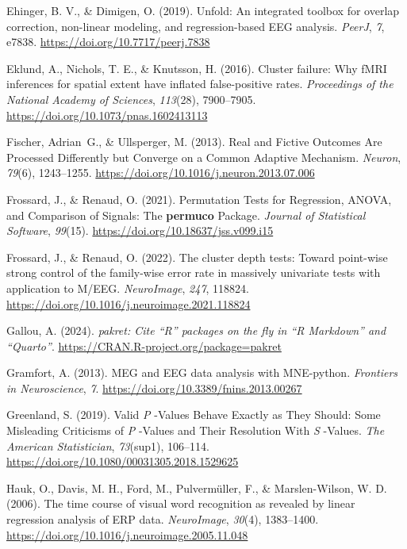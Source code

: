 \documentclass[
  doc,
  floatsintext,
  longtable,
  a4paper,
  nolmodern,
  notxfonts,
  notimes,
  colorlinks=true,linkcolor=blue,citecolor=blue,urlcolor=blue]{apa7}
\newlength{\cslhangindent}
\newenvironment{CSLReferences}[2] %
 {\begin{list}{}{%
  \setlength{\itemindent}{0pt}
  \setlength{\leftmargin}{0pt}
  \setlength{\parsep}{0pt}
  \ifodd #1
   \setlength{\leftmargin}{\cslhangindent}
   \setlength{\itemindent}{-1\cslhangindent}
  \fi
  \setlength{\itemsep}{#2\baselineskip}}}
 {\end{list}}
\begin{document}
\begin{CSLReferences}{1}{0}
Ehinger, B. V., \& Dimigen, O. (2019). Unfold: An integrated toolbox for
overlap correction, non-linear modeling, and regression-based {EEG}
analysis. \emph{PeerJ}, \emph{7}, e7838.
\url{https://doi.org/10.7717/peerj.7838}

Eklund, A., Nichols, T. E., \& Knutsson, H. (2016). Cluster failure: Why
fMRI inferences for spatial extent have inflated false-positive rates.
\emph{Proceedings of the National Academy of Sciences}, \emph{113}(28),
7900--7905. \url{https://doi.org/10.1073/pnas.1602413113}

Fischer, Adrian~G., \& Ullsperger, M. (2013). Real and Fictive Outcomes
Are Processed Differently but Converge on a Common Adaptive Mechanism.
\emph{Neuron}, \emph{79}(6), 1243--1255.
\url{https://doi.org/10.1016/j.neuron.2013.07.006}

Frossard, J., \& Renaud, O. (2021). Permutation Tests for Regression,
ANOVA, and Comparison of Signals: The {\textbf{permuco}} Package.
\emph{Journal of Statistical Software}, \emph{99}(15).
\url{https://doi.org/10.18637/jss.v099.i15}

Frossard, J., \& Renaud, O. (2022). The cluster depth tests: Toward
point-wise strong control of the family-wise error rate in massively
univariate tests with application to M/EEG. \emph{NeuroImage},
\emph{247}, 118824.
\url{https://doi.org/10.1016/j.neuroimage.2021.118824}

Gallou, A. (2024). \emph{{pakret}: Cite {``{R}''} packages on the fly in
{``{R Markdown}''} and {``{Quarto}''}}.
\url{https://CRAN.R-project.org/package=pakret}

Gramfort, A. (2013). MEG and EEG data analysis with MNE-python.
\emph{Frontiers in Neuroscience}, \emph{7}.
\url{https://doi.org/10.3389/fnins.2013.00267}

Greenland, S. (2019). Valid {\emph{P}} -Values Behave Exactly as They
Should: Some Misleading Criticisms of {\emph{P}} -Values and Their
Resolution With {\emph{S}} -Values. \emph{The American Statistician},
\emph{73}(sup1), 106--114.
\url{https://doi.org/10.1080/00031305.2018.1529625}

Hauk, O., Davis, M. H., Ford, M., Pulvermüller, F., \& Marslen-Wilson,
W. D. (2006). The time course of visual word recognition as revealed by
linear regression analysis of ERP data. \emph{NeuroImage}, \emph{30}(4),
1383--1400. \url{https://doi.org/10.1016/j.neuroimage.2005.11.048}


\end{CSLReferences}
\end{document}
